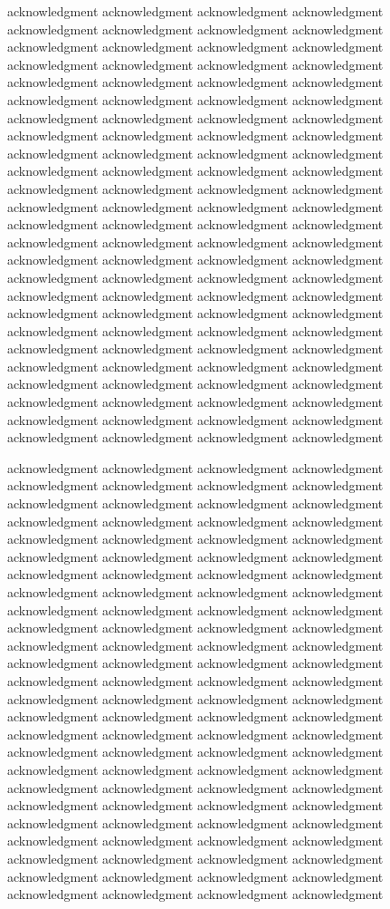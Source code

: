 \documentclass[platex,ja=standard,12pt,a4paper,twoside,onecolumn,fleqn,dvipdfmx,english]{bxjsbook}
\begin{document}
acknowledgment acknowledgment acknowledgment acknowledgment acknowledgment acknowledgment acknowledgment acknowledgment acknowledgment acknowledgment acknowledgment acknowledgment acknowledgment acknowledgment acknowledgment acknowledgment acknowledgment acknowledgment acknowledgment acknowledgment acknowledgment acknowledgment acknowledgment acknowledgment acknowledgment acknowledgment acknowledgment acknowledgment acknowledgment acknowledgment acknowledgment acknowledgment acknowledgment acknowledgment acknowledgment acknowledgment acknowledgment acknowledgment acknowledgment acknowledgment acknowledgment acknowledgment acknowledgment acknowledgment acknowledgment acknowledgment acknowledgment acknowledgment acknowledgment acknowledgment acknowledgment acknowledgment acknowledgment acknowledgment acknowledgment acknowledgment acknowledgment acknowledgment acknowledgment acknowledgment acknowledgment acknowledgment acknowledgment acknowledgment acknowledgment acknowledgment acknowledgment acknowledgment acknowledgment acknowledgment acknowledgment acknowledgment acknowledgment acknowledgment acknowledgment acknowledgment acknowledgment acknowledgment acknowledgment acknowledgment acknowledgment acknowledgment acknowledgment acknowledgment acknowledgment acknowledgment acknowledgment acknowledgment acknowledgment acknowledgment acknowledgment acknowledgment acknowledgment acknowledgment acknowledgment acknowledgment acknowledgment acknowledgment acknowledgment acknowledgment

acknowledgment acknowledgment acknowledgment acknowledgment acknowledgment acknowledgment acknowledgment acknowledgment acknowledgment acknowledgment acknowledgment acknowledgment acknowledgment acknowledgment acknowledgment acknowledgment acknowledgment acknowledgment acknowledgment acknowledgment acknowledgment acknowledgment acknowledgment acknowledgment acknowledgment acknowledgment acknowledgment acknowledgment acknowledgment acknowledgment acknowledgment acknowledgment acknowledgment acknowledgment acknowledgment acknowledgment acknowledgment acknowledgment acknowledgment acknowledgment acknowledgment acknowledgment acknowledgment acknowledgment acknowledgment acknowledgment acknowledgment acknowledgment acknowledgment acknowledgment acknowledgment acknowledgment acknowledgment acknowledgment acknowledgment acknowledgment acknowledgment acknowledgment acknowledgment acknowledgment acknowledgment acknowledgment acknowledgment acknowledgment acknowledgment acknowledgment acknowledgment acknowledgment acknowledgment acknowledgment acknowledgment acknowledgment acknowledgment acknowledgment acknowledgment acknowledgment acknowledgment acknowledgment acknowledgment acknowledgment acknowledgment acknowledgment acknowledgment acknowledgment acknowledgment acknowledgment acknowledgment acknowledgment acknowledgment acknowledgment acknowledgment acknowledgment acknowledgment acknowledgment acknowledgment acknowledgment acknowledgment acknowledgment acknowledgment acknowledgment
\end{document}
